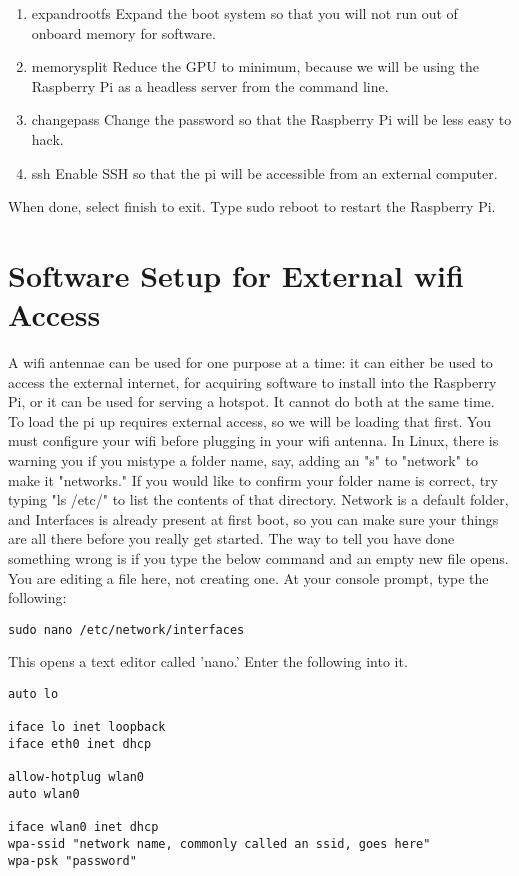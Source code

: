 \begin{enumerate}
\item expandrootfs Expand the boot system so that you will not run out of onboard memory for software.
\item memorysplit Reduce the GPU to minimum, because we will be using the Raspberry Pi as a headless server from the command line.
\item changepass Change the password so that the Raspberry Pi will be less easy to hack.
\item ssh Enable SSH so that the pi will be accessible from an external computer.
\end{enumerate}

When done, select finish to exit.
Type sudo reboot to restart the Raspberry Pi.

\section{Software Setup for External wifi Access}
A wifi antennae can be used for one purpose at a time: it can either be used to access the external internet, for acquiring software to install into the Raspberry Pi, or it can be used for serving a hotspot. It cannot do both at the same time. To load the pi up requires external access, so we will be loading that first. You must configure your wifi before plugging in your wifi antenna. 
In Linux, there is warning you if you mistype a folder name, say, adding an "s" to "network" to make it "networks." If you would like to confirm your folder name is correct, try typing "ls /etc/" to list the contents of that directory. Network is a default folder, and Interfaces is already present at first boot, so you can make sure your things are all there before you really get started. The way to tell you have done something wrong is if you type the below command and an empty new file opens. You are editing a file here, not creating one.
 At your console prompt, type the following:

\begin{lstlisting}
sudo nano /etc/network/interfaces
\end{lstlisting}

This opens a text editor called 'nano.' Enter the following into it.
\begin{lstlisting}
auto lo

iface lo inet loopback
iface eth0 inet dhcp

allow-hotplug wlan0
auto wlan0

iface wlan0 inet dhcp
wpa-ssid "network name, commonly called an ssid, goes here"
wpa-psk "password"
\end{lstlisting}

